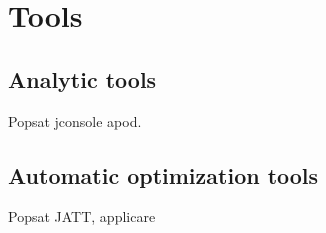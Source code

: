 \documentclass[
  digital, %
  oneside,
  notable, %
  nolof,     %
  nolot     %
]{fithesis3}
\begin{document}
\chapter{Tools}
\section{Analytic tools}
{\color{red} Popsat jconsole apod.}
\section{Automatic optimization tools}
{\color{red} Popsat JATT, applicare}








\end{document}
